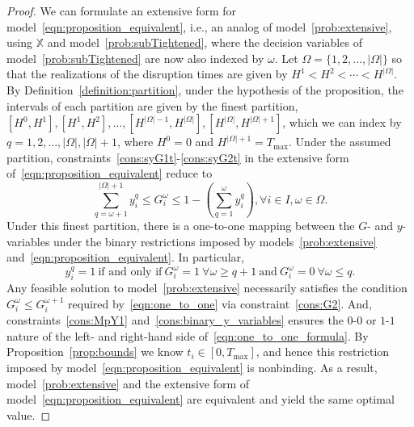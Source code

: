\documentclass[11pt]{article}
\begin{document}
	\begin{proof}
        We can formulate an extensive form for model~\eqref{eqn:proposition_equivalent}, i.e., an analog of model~\eqref{prob:extensive}, using $\mathbb{X}$ and model~\eqref{prob:subTightened}, where the decision variables of model~\eqref{prob:subTightened} are now also indexed by $\omega$. Let $\Omega=\{1,2,\ldots,|\Omega|\}$ so that the realizations of the disruption times are given by $H^1 < H^2 < \cdots < H^{|\Omega|}$. By Definition~\ref{definition:partition}, under the hypothesis of the proposition, the intervals of each partition are given by the finest partition, $[H^0,H^1], [H^1,H^2], \ldots, [H^{|\Omega|-1},H^{|\Omega|}], [H^{|\Omega|},H^{|\Omega|+1}]$, which we can index by $q=1,2,\ldots,|\Omega|,|\Omega|+1$, where $H^0=0$ and $H^{|\Omega|+1}=T_{\max}$. Under the assumed partition, constraints~\eqref{cons:syG1t}-\eqref{cons:syG2t} in the extensive form of~\eqref{eqn:proposition_equivalent} reduce to
        \begin{equation}\label{eqn:one_to_one_formula}
            \sum_{q=\omega+1}^{|\Omega|+1} y_i^{q} \le G_i^\omega \le 1 - \left ( \sum_{q=1}^\omega y_i^{q} \right ), \forall i \in I, \omega \in \Omega.
        \end{equation}
        Under this finest partition, there is a one-to-one mapping between the $G$- and $y$-variables under the binary restrictions imposed by models~\eqref{prob:extensive} and~\eqref{eqn:proposition_equivalent}. In particular,  
        \begin{equation}\label{eqn:one_to_one}
        y_i^q=1 \ \mbox{if and only if} \  G_i^\omega=1 \  \forall \omega \ge q+1 \ \mbox{and} \ G_i^\omega=0 \ \forall \omega \le q. 
        \end{equation}
        Any feasible solution to model~\eqref{prob:extensive} necessarily satisfies the condition $G_i^{\omega} \le G_i^{\omega+1}$ required by~\eqref{eqn:one_to_one} via constraint~\eqref{cons:G2}. And, constraints~\eqref{cons:MpY1} and~\eqref{cons:binary_y_variables} ensures the $0$-$0$ or $1$-$1$ nature of the left- and right-hand side of~\eqref{eqn:one_to_one_formula}. By Proposition~\ref{prop:bounds} we know $t_i \in [0,T_{\max}]$, and hence this restriction imposed by model~\eqref{eqn:proposition_equivalent} is nonbinding. As a result, model~\eqref{prob:extensive} and the extensive form of model~\eqref{eqn:proposition_equivalent} are equivalent and yield the same optimal value. 
    \end{proof}
\end{document}
